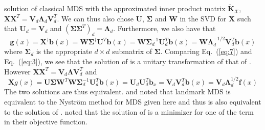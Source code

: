 \documentclass{article}
\begin{document}
solution of classical MDS with the approximated inner product matrix
$\tilde{\mathbf{K}}_{\mathcal{X}}$, $\mathbf{X}\mathbf{X}^{T} =
\mathbf{V}_d\bm{\Lambda}_{d}\mathbf{V}_{d}^{T}$. We can thus also chose
$\mathbf{U}$, $\bm{\Sigma}$ and $\mathbf{W}$ in the SVD for
$\mathbf{X}$ such that $\mathbf{U}_d = \mathbf{V}_d$ and
$(\bm{\Sigma}\bm{\Sigma}^{T})_{d} = \bm{\Lambda}_d$. Furthermore, we
also have that
\begin{equation}
  \label{eq:7}
  \mathbf{g}(x) = \mathbf{X}^{\dagger} \mathbf{b}(x) = \mathbf{W} \bm{\Sigma}^{\dagger}\mathbf{U}^{T}
  \mathbf{b}(x) = \mathbf{W} \bm{\Sigma}_d^{-1} \mathbf{U}_d^{T}
  \mathbf{b}(x) = \mathbf{W} \bm{\Lambda}_d^{-1/2} \mathbf{V}_d^{T}
  \mathbf{b}(x)
\end{equation}
where $\bm{\Sigma}_d$ is the appropriate $d \times d$ submatrix of
$\bm{\Sigma}$. Comparing Eq.~(\ref{eq:7}) and Eq.~(\ref{eq:3}), we see
that the solution of \cite{anderson03:_gener} is a unitary
transformation of that of
\cite{bengio04:_out_lle_isomap_mds_eigen}. However
$\mathbf{X}\mathbf{X}^{T} = \mathbf{V}_d \bm{\Lambda}
\mathbf{V}_{d}^{T}$ and
\begin{equation*}
  \mathbf{X}g(x) =
  \mathbf{U} \bm{\Sigma}
  \mathbf{W}^{T}\mathbf{W}\bm{\Sigma}_d^{-1}\mathbf{U}_d^{T}\mathbf{b}(x)
  = \mathbf{U}_d\mathbf{U}_d^{T}\mathbf{b}_x =
  \mathbf{V}_d\mathbf{V}_d^{T} \mathbf{b}(x) = \mathbf{V}_d \bm{\Lambda}_d^{1/2}\mathbf{f}(x)
\end{equation*}
The two solutions are thus
equivalent. \citet{bengio04:_out_lle_isomap_mds_eigen} and
\citet{platt05:_fastm_metric_mds_nyst} noted that landmark MDS
\citep{silva02:_global} is equivalent to the Nystr\"{o}m method for
MDS given here and thus is also equivalent to the solution of
\citet{anderson03:_gener}. \cite{trosset08} noted that the
solution of \cite{anderson03:_gener} is a minimizer for one of the
term in their objective function. 

\end{document}
